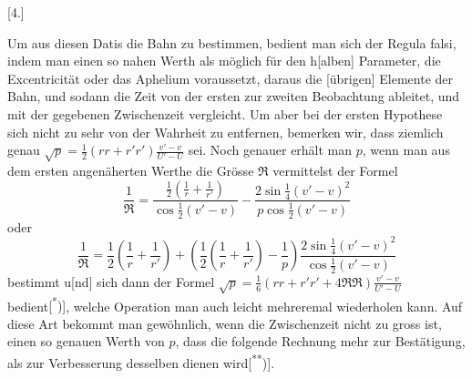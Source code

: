 \clearpage\begingroup{}
\noindent{\small [S. 4]}
\begin{center}[4.]\end{center}
\noindent\hspace*{\parindent}Um aus diesen Datis die Bahn zu bestimmen, bedient man sich der Regula falsi, indem man einen so nahen Werth als möglich für den h[alben] Parameter, die Excentricität oder das Aphelium voraussetzt, daraus die [übrigen] Elemente der Bahn, und sodann die Zeit von der ersten zur zweiten Beobachtung ableitet, und mit der gegebenen Zwischenzeit vergleicht. Um aber bei der ersten Hypothese sich nicht zu sehr von der Wahrheit zu entfernen, bemerken wir, dass ziemlich genau $\surd p=\frac12(rr+r'r')\frac{v'-v}{U'-U}$ sei. Noch genauer erhält man $p$, wenn man aus dem ersten angenäherten Werthe die Grösse $\mathfrak{R}$ vermittelst der Formel
\[
\frac{1}{\mathfrak{R}}=
\frac{\frac12\left(\frac1r+\frac1{r'}\right)}{\cos\frac12(v'-v)}
-\frac{2\sin\frac14(v'-v)^2}{p\cos\frac12(v'-v)}
\]
\clearpage
{}
\noindent oder
\[
\frac1{\mathfrak{R}}=\frac12\left(\frac1r+\frac1{r'}\right)
+\left(\frac12\left(\frac1r+\frac1{r'}\right)-\frac1p\right)
\frac{2\sin\frac14(v'-v)^2}{\cos\frac12(v'-v)}
\]
\noindent bestimmt u[nd] sich dann der Formel $\surd p=\frac16(rr+r'r'+4\mathfrak{R}\mathfrak{R})\frac{v'-v}{U'-U}$ bedient\textup{[\textsuperscript{*})]}, welche Operation man auch leicht mehreremal wiederholen kann. Auf diese Art bekommt man gewöhnlich, wenn die Zwischenzeit nicht zu gross ist, einen so genauen Werth von $p$, dass die folgende Rechnung mehr zur Bestätigung, als zur Verbesserung desselben dienen wird\textup{[\textsuperscript{**})]}.
\begingroup\renewcommand{\thefootnote}{}\endgroup
